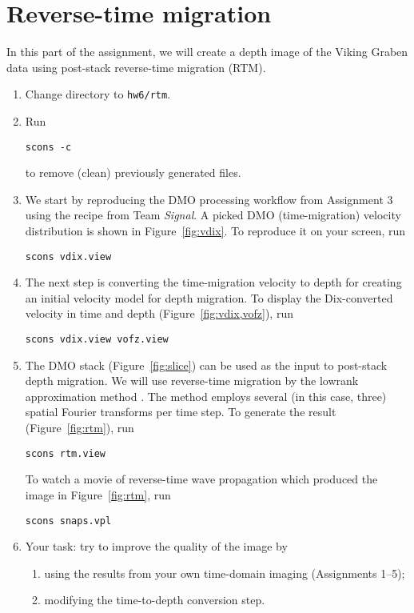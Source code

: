 \lstset{language=python,numbers=left,numberstyle=\tiny,showstringspaces=false}


\section{Reverse-time migration}

In this part of the assignment, we will create a depth image of the
Viking Graben data using post-stack reverse-time migration (RTM).

\begin{enumerate}

\item Change directory to \texttt{hw6/rtm}.
\item Run
\begin{verbatim}
scons -c
\end{verbatim}
to remove (clean) previously generated files.
\item We start by reproducing the DMO processing workflow from Assignment 3 using the recipe from Team \emph{Signal}. A picked DMO (time-migration) velocity distribution is shown in Figure~\ref{fig:vdix}. To reproduce it on your screen, run
\begin{verbatim}
scons vdix.view
\end{verbatim}
\item The next step is converting the time-migration velocity to depth for creating an initial velocity model for depth migration.  To display the Dix-converted velocity in time and depth (Figure~\ref{fig:vdix,vofz}), run
\begin{verbatim}
scons vdix.view vofz.view
\end{verbatim}
\item The DMO stack (Figure~\ref{fig:slice}) can be used as the input to post-stack depth migration. We will use reverse-time migration by the lowrank approximation method \cite[]{lowrank}. The method employs several (in this case, three) spatial Fourier transforms per time step. To generate the result (Figure~\ref{fig:rtm}), run
\begin{verbatim}
scons rtm.view
\end{verbatim}
To watch a movie of reverse-time wave propagation which produced the image in Figure~\ref{fig:rtm}, run
\begin{verbatim}
scons snaps.vpl
\end{verbatim}
\item Your task: try to improve the quality of the image by 
\begin{enumerate}
\item using the results from your own time-domain imaging (Assignments 1--5);
\item modifying the time-to-depth conversion step.
\end{enumerate}


\end{enumerate}

